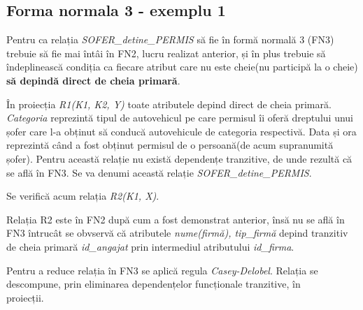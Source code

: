 \documentclass[12pt, a4paper]{article}
\begin{document}
\subsection*{Forma normala 3 - exemplu 1}
Pentru ca relația \emph{SOFER\_detine\_PERMIS} să fie în formă normală 3 (FN3) trebuie să fie mai întâi în FN2, lucru realizat anterior, și în plus trebuie să îndeplinească condiția ca fiecare atribut care nu este cheie(nu participă la o cheie) \textbf{să depindă direct de cheia primară}.

În proiecția \emph{R1(K1, K2, Y)} toate atributele depind direct de cheia primară. \emph{Categoria} reprezintă tipul de autovehicul pe care permisul îi oferă dreptului unui șofer care l-a obținut să conducă autovehicule de categoria respectivă. Data și ora reprezintă când a fost obținut permisul de o persoană(de acum supranumită șofer). Pentru această relație nu există dependențe tranzitive, de unde rezultă că se află în FN3. Se va denumi această relație \emph{SOFER\_detine\_PERMIS}.

Se verifică acum relația \emph{R2(K1, X)}.

\begin{table}[!htbp]
\begin{center}
\caption{Relația \emph{R2(K1, X)}}\label{tab5}
\end{center}
\end{table}

Relația R2 este în FN2 după cum a fost demonstrat anterior, însă nu se află în FN3 întrucât se obvservă că atributele \emph{nume(firmă), tip\_firmă} depind tranzitiv de cheia primară \emph{id\_angajat} prin intermediul atributului \emph{id\_firma}.

Pentru a reduce relația în FN3 se aplică regula \emph{Casey-Delobel}. Relația se descompune, prin eliminarea dependențelor funcționale tranzitive, în \\proiecții.
\end{document}
